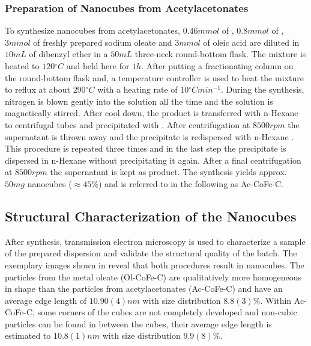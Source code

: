 \documentclass[\main/dresen_thesis.tex]{subfiles}
\begin{document}
    \subsubsection{Preparation of Nanocubes from Acetylacetonates}
      To synthesize nanocubes from acetylacetonates, $0.46 \unit{mmol}$ of , $0.8 \unit{mmol}$ of , $3 \unit{mmol}$ of freshly prepared sodium oleate and $3 \unit{mmol}$ of oleic acid are diluted in $10 \unit{mL}$ of dibenzyl ether in a $50 \unit{mL}$ three-neck round-bottom flask.
      The mixture is heated to $120 \unit{^\circ C}$ and held here for $1 \unit{h}$.
      After putting a fractionating column on the round-bottom flask and, a temperature controller is used to heat the mixture to reflux at about $290 \unit{^\circ C}$ with a heating rate of $10 \unit{^\circ C min^{-1}}$.
      During the synthesis, nitrogen is blown gently into the solution all the time and the solution is magnetically stirred.
      After cool down, the product is transferred with n-Hexane to centrifugal tubes and precipitated with .
      After centrifugation at $8500 \unit{rpm}$ the supernatant is thrown away and the precipitate is redispersed with n-Hexane .
      This procedure is repeated three times and in the last step the precipitate is dispersed in n-Hexane without precipitating it again.
      After a final centrifugation at $8500 \unit{rpm}$ the supernatant is kept as product.
      The synthesis yields approx. $50 \unit{mg}$ nanocubes ($\approx 45 \%$) and is referred to in the following as Ac-CoFe-C.

  \subsection{Structural Characterization of the Nanocubes}
  \label{sec:monolayers:nanoparticle:structuralCharacterization}
    After synthesis, transmission electron microscopy is used to characterize a sample of the prepared dispersion and validate the structural quality of the batch.
    The exemplary images shown in  reveal that both procedures result in nanocubes.
    The particles from the metal oleate (Ol-CoFe-C) are qualitatively more homogeneous in shape than the particles from acetylacetonates (Ac-CoFe-C) and have an average edge length of $10.90(4) \unit{nm}$ with size distribution $8.8(3) \unit{\%}$.
    Within Ac-CoFe-C, some corners of the cubes are not completely developed and non-cubic particles can be found in between the cubes, their average edge length is estimated to $10.8(1) \unit{nm}$ with size distribution $9.9(8) \unit{\%}$.
\end{document}

